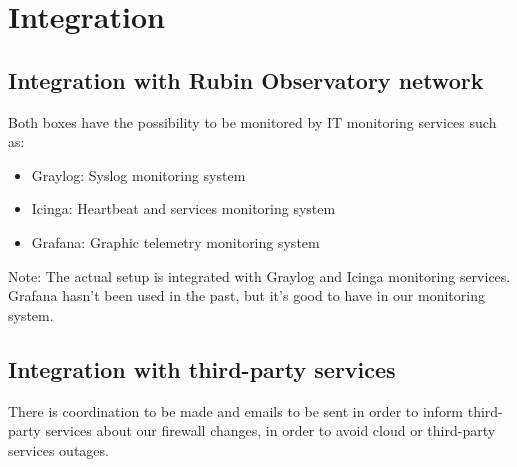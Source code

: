 \section{Integration}

\subsection{Integration with Rubin Observatory network}

Both boxes have the possibility to be monitored by IT monitoring services such as:

\begin{itemize}
    \item Graylog: Syslog monitoring system
    \item Icinga: Heartbeat and services monitoring system
    \item Grafana: Graphic telemetry monitoring system
\end{itemize}

Note: The actual setup is integrated with Graylog and Icinga monitoring services. Grafana hasn't been used in the past, but it's good to have in our monitoring system.


\subsection{Integration with third-party services}

There is coordination to be made and emails to be sent in order to inform third-party services about our firewall changes, in order to avoid cloud or third-party services outages.